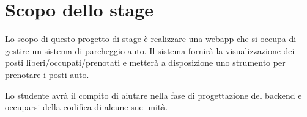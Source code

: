 \section*{Scopo dello stage}
Lo scopo di questo progetto di stage è realizzare una webapp che si 
occupa di gestire un sistema di parcheggio auto.
Il sistema fornirà la visualizzazione dei posti 
liberi/occupati/prenotati e metterà a disposizione uno strumento
per prenotare i posti auto.

Lo studente avrà il compito di aiutare nella fase di progettazione 
del backend e occuparsi della codifica di alcune sue unità.

